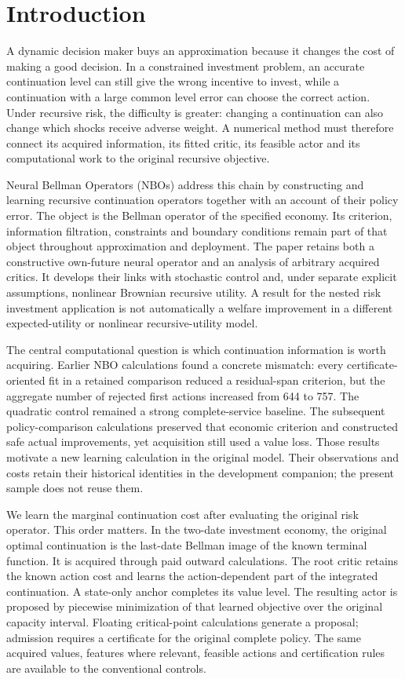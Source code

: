\section{Introduction}
\label{sec:introduction121}

A dynamic decision maker buys an approximation because it changes the cost of
making a good decision. In a constrained investment problem, an accurate
continuation level can still give the wrong incentive to invest, while a
continuation with a large common level error can choose the correct action.
Under recursive risk, the difficulty is greater: changing a continuation can
also change which shocks receive adverse weight. A numerical method must
therefore connect its acquired information, its fitted critic, its feasible
actor and its computational work to the original recursive objective.

Neural Bellman Operators (NBOs) address this chain by constructing and learning
recursive continuation operators together with an account of their policy
error. The object is the Bellman operator of the specified economy. Its
criterion, information filtration, constraints and boundary conditions remain
part of that object throughout approximation and deployment. The paper retains
both a constructive own-future neural operator and an analysis of arbitrary
acquired critics. It develops their links with stochastic control and, under
separate explicit assumptions, nonlinear Brownian recursive utility. A result
for the nested risk investment application is not automatically a welfare
improvement in a different expected-utility or nonlinear recursive-utility
model.

The central computational question is which continuation information is worth
acquiring. Earlier NBO calculations found a concrete mismatch: every
certificate-oriented fit in a retained comparison reduced a residual-span
criterion, but the aggregate number of rejected first actions increased from
644 to 757. The quadratic control remained a strong complete-service baseline.
The subsequent policy-comparison calculations preserved that economic
criterion and constructed safe actual improvements, yet acquisition still
used a value loss. Those results motivate a new learning calculation in the
original model. Their observations and costs retain their historical
identities in the development companion; the present sample does not reuse
them.

We learn the marginal continuation cost after evaluating the original risk
operator. This order matters. In the two-date investment economy, the original
optimal continuation is the last-date Bellman image of the known terminal
function. It is acquired through paid outward calculations. The root critic
retains the known action cost and learns the action-dependent part of the
integrated continuation. A state-only anchor completes its value level.
The resulting actor is proposed by piecewise minimization of that learned
objective over the original capacity interval. Floating critical-point
calculations generate a proposal; admission requires a certificate for the
original complete policy. The same acquired values, features where relevant, feasible
actions and certification rules are available to the conventional controls.

